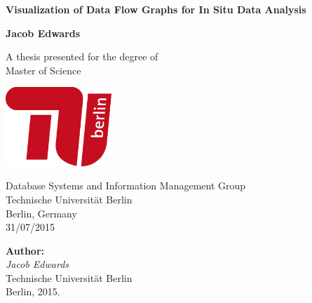 \documentclass[%
   a4paper,%
  11pt,                    %
  openright,              %
  headsepline,          %
  cleardoubleempty,
  chapterprefix,
  titlepage,%
  liststotoc,%
  bibtotoc,%
  idxtotoc,%
  headinclude,           %
  pointlessnumbers,%
  USenglish
  ]{scrbook}
\theoremstyle{break}
\begin{document}
\begin{titlepage}
    \begin{center}
        \vspace*{1cm}
        
        \Huge
        \textbf{Visualization of Data Flow Graphs for In Situ Data Analysis}
        
        \vspace{0.5cm}
        \LARGE
        
        \vspace{1.5cm}
        
        \textbf{Jacob Edwards}
        
        \vfill
        
        A thesis presented for the degree of\\
        Master of Science
        
        \vspace{0.8cm}
        
        \includegraphics[width=0.3\textwidth]{tub_logo.png}
        
        \Large
        Database Systems and Information Management Group\\
        Technische Universität Berlin\\
        Berlin, Germany\\
        31/07/2015
        
    \end{center}
\end{titlepage}


\vspace*{\fill}
\begin{minipage}{15cm}
\textbf{Author:}\\
\emph{Jacob Edwards}\\Technische Universität Berlin\\
Berlin, 2015.
\end{minipage}
\newpage
\end{document}
